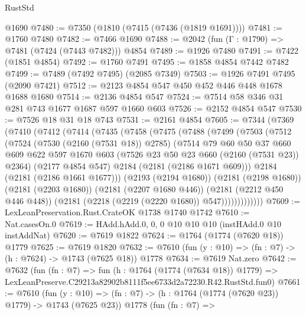 \begin{lexlean}{RustStd}
\begin{coremodule}
    @1690
@7480 := @7350 (@1810 (@7415 (@7436 (@1819 @1691))))
@7481 := @1760 @7480
@7482 := @7466 @1690
@7488 := @2042 (fun (Γ : @1790) => @7481 (@7424 (@7443 @7482))) @4854
@7489 := @1926 @7480
@7491 := @7422 (@1851 @4854)
@7492 := @1760 @7491
@7495 := @1858 @4854 @7442 @7482
@7499 := @7489 (@7492 @7495) (@2085 @7349)
@7503 := @1926 @7491 @7495 (@2090 @7421)
@7512 := @2123 @4854 @547 @450 @452 @446 @448 @1678 @1688 @1680
@7514 := @2136 @4854 @547
@7524 := @7514 @58 @346 @31 @281 @743 @1677 @1687 @597 @1660 @603
@7526 := @2152 @4854 @547
@7530 := @7526 @18 @31 @18 @743
@7531 := @2161 @4854
@7605 := @7344
    (@7369
      (@7410
        (@7412
          (@7414
            (@7435
              (@7458
                (@7475
                  (@7488
                    (@7499
                      (@7503
                        (@7512
                          (@7524
                            (@7530 (@2160 (@7531 @18)) @2785)
                            (@7514
                              @79
                              @60
                              @50
                              @37
                              @660
                              @609
                              @622
                              @597
                              @1670
                              @603
                              (@7526 @23 @50 @23 @660 (@2160 (@7531 @23)) @2364)
                              (@2177 @4854 @547)
                              @2184
                              (@2181 (@2186 @1671 @609)))
                            @2184
                            (@2181 (@2186 @1661 @1677)))
                          (@2193 (@2194 @1680))
                          (@2181 (@2198 @1680))
                          (@2181 (@2203 @1680))
                          (@2181 (@2207 @1680 @446))
                          (@2181 (@2212 @450 @446 @448))
                          (@2181 (@2218 (@2219 (@2220 @1680)) @547)))))))))))))
@7609 := LexLeanPreservation.Rust.CrateOK @1738 @1740 @1742
@7610 := Nat.casesOn.{0}
@7619 := HAdd.hAdd.{0, 0, 0} @10 @10 @10 (instHAdd.{0} @10 instAddNat)
@7620 := @7619 @1822
@7624 := @1764 (@1774 (@7620 @18)) @1779
@7625 := @7619 @1820
@7632 := @7610 (fun (y : @10) => (fn : @7) -> (h : @7624) -> @1743 (@7625 @18)) @1778
@7634 := @7619 Nat.zero
@7642 := @7632
    (fun (fn : @7) =>
    fun (h : @1764 (@1774 (@7634 @18)) @1779) =>
    LexLeanPreserve.C29213a82902b8111f5ee6733d2a72230.R42.RustStd.fun0)
@7661 := @7610
    (fun (y : @10) => (fn : @7) -> (h : @1764 (@1774 (@7620 @23)) @1779) -> @1743 (@7625 @23))
    @1778
    (fun (fn : @7) =>

\end{coremodule}
\end{lexlean}
